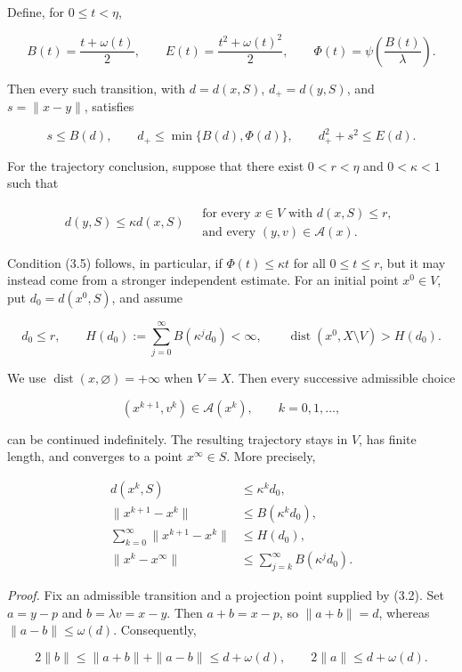 \documentclass[11pt,a4paper]{article}
\theoremstyle{plain}
\theoremstyle{definition}
\theoremstyle{remark}
\begin{document}
Define, for \(0\le t<\eta\),

\[
B(t)=\frac{t+\omega(t)}2,
\qquad
E(t)=\frac{t^2+\omega(t)^2}2,
\qquad
\Phi(t)=\psi\!\left(\frac{B(t)}\lambda\right).
\tag{3.3}
\]

Then every such transition, with \(d=d(x,S)\), \(d_+=d(y,S)\), and
\(s=\|x-y\|\), satisfies

\[
s\le B(d),
\qquad
d_+\le\min\{B(d),\Phi(d)\},
\qquad
d_+^2+s^2\le E(d).
\tag{3.4}
\]

For the trajectory conclusion, suppose that there exist \(0<r<\eta\) and
\(0<\kappa<1\) such that

\[
d(y,S)\le\kappa d(x,S)
\quad
\begin{array}{l}
\text{for every }x\in V\text{ with }d(x,S)\le r,\\
\text{and every }(y,v)\in\mathcal A(x).
\end{array}
\tag{3.5}
\]

Condition (3.5) follows, in particular, if \(\Phi(t)\le\kappa t\) for
all \(0\le t\le r\), but it may instead come from a stronger independent
estimate. For an initial point \(x^0\in V\), put \(d_0=d(x^0,S)\), and
assume

\[
d_0\le r,
\qquad
H(d_0):=\sum_{j=0}^{\infty}B(\kappa^j d_0)<\infty,
\qquad
\operatorname{dist}(x^0,X\setminus V)>H(d_0).
\tag{3.6}
\]

We use \(\operatorname{dist}(x,\varnothing)=+\infty\) when \(V=X\). Then
every successive admissible choice

\[
(x^{k+1},v^k)\in\mathcal A(x^k),\qquad k=0,1,\ldots,
\tag{3.7}
\]

can be continued indefinitely. The resulting trajectory stays in \(V\),
has finite length, and converges to a point \(x^\infty\in S\). More
precisely,

\[
\begin{aligned}
d(x^k,S)&\le\kappa^k d_0,\\
\|x^{k+1}-x^k\|&\le B(\kappa^k d_0),\\
\sum_{k=0}^{\infty}\|x^{k+1}-x^k\|&\le H(d_0),\\
\|x^k-x^\infty\|&\le\sum_{j=k}^{\infty}B(\kappa^j d_0).
\end{aligned}
\tag{3.8}
\]

\emph{Proof.} Fix an admissible transition and a projection point
supplied by (3.2). Set \(a=y-p\) and \(b=\lambda v=x-y\). Then
\(a+b=x-p\), so \(\|a+b\|=d\), whereas \(\|a-b\|\le\omega(d)\).
Consequently,

\[
2\|b\|\le\|a+b\|+\|a-b\|\le d+\omega(d),
\qquad
2\|a\|\le d+\omega(d).
\tag{3.9}
\]
\end{document}

